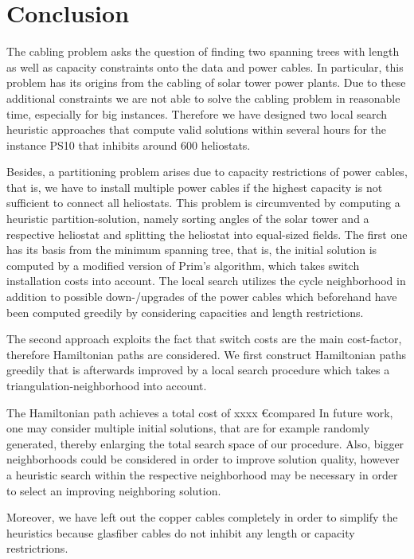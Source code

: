 \section{Conclusion}
The cabling problem asks the question of finding two spanning trees with length as well as capacity constraints onto the data and power cables. In particular, this problem has its origins from the cabling of solar tower power plants. Due to these additional constraints we are not able to solve the cabling problem in reasonable time, especially for big instances. Therefore we have designed two local search heuristic approaches that compute valid solutions within several hours for the instance PS10 that inhibits around 600 heliostats.

Besides, a partitioning problem arises due to capacity restrictions of power cables, that is, we have to install multiple power cables if the highest capacity is not sufficient to connect all heliostats. This problem is circumvented by computing a heuristic partition-solution, namely sorting angles of the solar tower and a respective heliostat and splitting the heliostat into equal-sized fields.
\emptyline
The first one has its basis from the minimum spanning tree, that is, the initial solution is computed by a modified version of Prim's algorithm, which takes switch installation costs into account. The local search utilizes the cycle neighborhood in addition to possible down-/upgrades of the power cables which beforehand have been computed greedily by considering capacities and length restrictions.

The second approach exploits the fact that switch costs are the main cost-factor, therefore Hamiltonian paths are considered. We first construct Hamiltonian paths greedily that is afterwards improved by a local search procedure which takes a triangulation-neighborhood into account.

The Hamiltonian path achieves a total cost of xxxx  \euro compared 
\emptyline
In future work, one may consider multiple initial solutions, that are for example randomly generated, thereby enlarging the total search space of our procedure. Also, bigger neighborhoods could be considered in order to improve solution quality, however a heuristic search within the respective neighborhood may be necessary in order to select an improving neighboring solution. 

Moreover, we have left out the copper cables completely in order to simplify the heuristics because glasfiber cables do not inhibit any length or capacity restrictrions.

